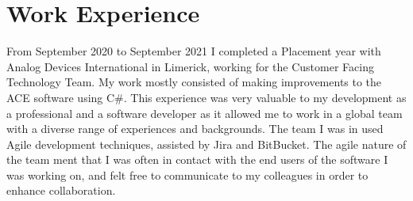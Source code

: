 \documentclass[]{twentysecondcv}
\begin{document}
\cvdate{\today}        %




\makeprofile

\section{Work Experience}
From September 2020 to September 2021 I completed a Placement year with Analog Devices International in Limerick, working for the Customer Facing Technology Team. My work mostly consisted of making improvements to the ACE software using C\#. This experience was very valuable to my development as a professional and a software developer as it allowed me to work in a global team with a diverse range of experiences and backgrounds. The team I was in used Agile development techniques, assisted by Jira and BitBucket.
The agile nature of the team ment that I was often in contact with the end users of the software I was working on, and felt free to communicate to my colleagues in order to enhance collaboration.
\end{document}
